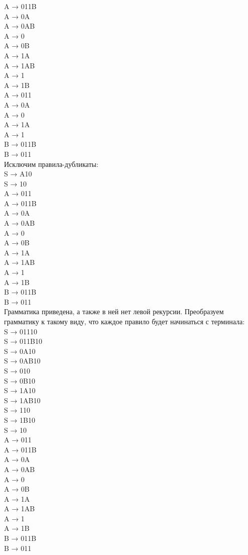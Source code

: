 \documentclass[a4paper,14pt]{extarticle}
\begin{document}
\begin{enumerate}[1.]
    A → 011B\\
    A → 0A\\
    A → 0AB\\
    A → 0\\
    A → 0B\\
    A → 1A\\
    A → 1AB\\
    A → 1\\
    A → 1B\\
    A → 011\\
    A → 0A\\
    A → 0\\
    A → 1A\\
    A → 1\\
    B → 011B\\
    B → 011\\
    Исключим правила-дубликаты:\\
    S → A10\\
    S → 10\\
    A → 011\\
    A → 011B\\
    A → 0A\\
    A → 0AB\\
    A → 0\\
    A → 0B\\
    A → 1A\\
    A → 1AB\\
    A → 1\\
    A → 1B\\
    B → 011B\\
    B → 011\\
    Грамматика приведена, а также в ней нет левой рекурсии. 
    Преобразуем грамматику к такому виду, что каждое 
    правило будет начинаться с терминала:\\ 

    S → 01110\\
    S → 011B10\\
    S → 0A10\\
    S → 0AB10\\
    S → 010\\
    S → 0B10\\
    S → 1A10\\
    S → 1AB10\\
    S → 110\\
    S → 1B10\\
    S → 10\\
    A → 011\\
    A → 011B\\
    A → 0A\\
    A → 0AB\\
    A → 0\\
    A → 0B\\
    A → 1A\\
    A → 1AB\\
    A → 1\\
    A → 1B\\
    B → 011B\\
    B → 011\\


\end{enumerate}
\end{document}
